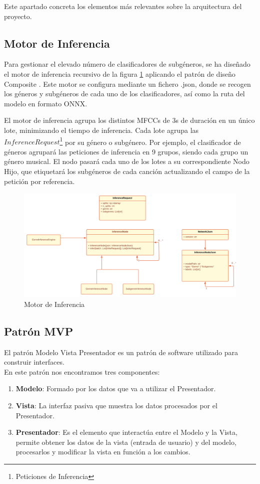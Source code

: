 Este apartado concreta los elementos más relevantes sobre la arquitectura del proyecto. 

\subsection{Motor de Inferencia}

Para gestionar el elevado número de clasificadores de subgéneros, se ha diseñado el motor de inferencia recursivo de la figura \ref{fig:C:IE} aplicando el patrón de diseño Composite \cite{C:Composit36:online}. Este motor se configura mediante un fichero .json, donde se recogen los géneros y subgéneros de cada uno de los clasificadores, así como la ruta del modelo en formato ONNX. 

El motor de inferencia agrupa los distintos MFCCs de 3s de duración en un único lote, minimizando el tiempo de inferencia. Cada lote agrupa las $Inference Request$\footnote{Peticiones de Inferencia} por su género o subgénero. Por ejemplo, el clasificador de géneros agrupará las peticiones de inferencia en 9 grupos, siendo cada grupo un género musical. El nodo pasará cada uno de los lotes a su correspondiente Nodo Hijo, que etiquetará los subgéneros de cada canción actualizando el campo de la petición por referencia.


\begin{figure}
    \centering
    \includegraphics{img/C/IE.png}
    \caption{Motor de Inferencia}
    \label{fig:C:IE}
\end{figure}


\subsection{Patrón MVP} \label{modelo_vista_presentador}

El patrón Modelo Vista Presentador \cite{C:MVP:enwiki:1054194939} es un patrón de software utilizado para construir interfaces.\\
En este patrón nos encontramos tres componentes:
\begin{enumerate}
    \item \textbf{Modelo}: Formado por los datos que va a utilizar el Presentador.
    \item \textbf{Vista}: La interfaz pasiva que muestra los datos procesados por el Presentador.
    \item \textbf{Presentador}: Es el elemento que interactúa entre el Modelo y la Vista, permite obtener los datos de la vista (entrada de usuario) y del modelo, procesarlos y modificar la vista en función a los cambios. 
\end{enumerate}

